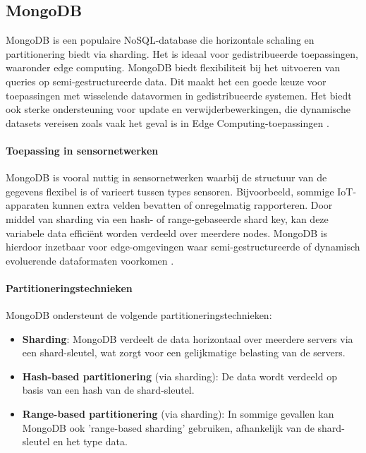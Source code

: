 \subsection{MongoDB}

MongoDB is een populaire NoSQL-database die horizontale schaling en partitionering biedt via sharding. Het is ideaal voor gedistribueerde toepassingen, waaronder edge computing. MongoDB biedt flexibiliteit bij het uitvoeren van queries op semi-gestructureerde data. Dit maakt het een goede keuze voor toepassingen met wisselende datavormen in gedistribueerde systemen. Het biedt ook sterke ondersteuning voor update en verwijderbewerkingen, die dynamische datasets vereisen zoals vaak het geval is in Edge Computing-toepassingen \autocite{MongoDBDocumentation}.

\paragraph{Toepassing in sensornetwerken}  
MongoDB is vooral nuttig in sensornetwerken waarbij de structuur van de gegevens flexibel is of varieert tussen types sensoren. Bijvoorbeeld, sommige IoT-apparaten kunnen extra velden bevatten of onregelmatig rapporteren. Door middel van sharding via een hash- of range-gebaseerde shard key, kan deze variabele data efficiënt worden verdeeld over meerdere nodes. MongoDB is hierdoor inzetbaar voor edge-omgevingen waar semi-gestructureerde of dynamisch evoluerende dataformaten voorkomen \autocite{MongoDBDocumentation, Mahmud2020}.

\paragraph{Partitioneringstechnieken}  
MongoDB ondersteunt de volgende partitioneringstechnieken:
\begin{itemize}
    \item \textbf{Sharding}: MongoDB verdeelt de data horizontaal over meerdere servers via een shard-sleutel, wat zorgt voor een gelijkmatige belasting van de servers.
    \item \textbf{Hash-based partitionering} (via sharding): De data wordt verdeeld op basis van een hash van de shard-sleutel.
    \item \textbf{Range-based partitionering} (via sharding): In sommige gevallen kan MongoDB ook 'range-based sharding' gebruiken, afhankelijk van de shard-sleutel en het type data.
\end{itemize}


